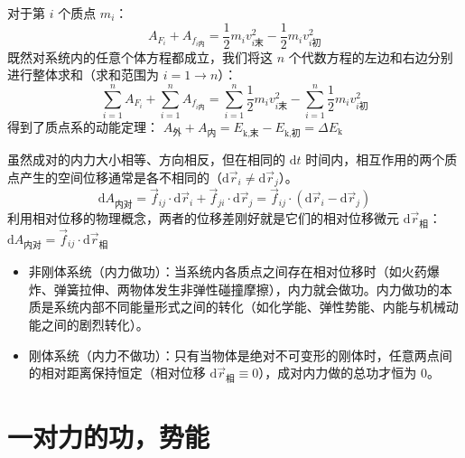 \documentclass[lang=cn,11pt]{elegantbook}
\begin{document}
\begin{theorem}[质点系动能定理]
对于第 $i$ 个质点 $m_i$：$$A_{F_i} + A_{f_{i\text{内}}} = \frac{1}{2}m_iv_{i\text{末}}^2 - \frac{1}{2}m_iv_{i\text{初}}^2$$既然对系统内的任意个体方程都成立，我们将这 $n$ 个代数方程的左边和右边分别进行整体求和（求和范围为 $i=1 \to n$）：$$\sum_{i=1}^{n} A_{F_i} + \sum_{i=1}^{n} A_{f_{i\text{内}}} = \sum_{i=1}^{n} \frac{1}{2}m_iv_{i\text{末}}^2 - \sum_{i=1}^{n} \frac{1}{2}m_iv_{i\text{初}}^2$$得到了质点系的动能定理： \(A_{\text{外}} + A_{\text{内}} = E_{\text{k,末}} - E_{\text{k,初}} = \Delta E_{\text{k}}\) 
\end{theorem}
\begin{note}
虽然成对的内力大小相等、方向相反，但在相同的 $\mathrm{d}t$ 时间内，相互作用的两个质点产生的空间位移通常是各不相同的（$\mathrm{d}\vec{r}_i \neq \mathrm{d}\vec{r}_j$）。$$\mathrm{d}A_{\text{内对}} = \vec{f}_{ij} \cdot \mathrm{d}\vec{r}_i + \vec{f}_{ji} \cdot \mathrm{d}\vec{r}_j = \vec{f}_{ij} \cdot (\mathrm{d}\vec{r}_i - \mathrm{d}\vec{r}_j)$$利用相对位移的物理概念，两者的位移差刚好就是它们的相对位移微元 $\mathrm{d}\vec{r}_{\text{相}}$： \(\mathrm{d}A_{\text{内对}} = \vec{f}_{ij} \cdot \mathrm{d}\vec{r}_{\text{相}}\) 
\begin{itemize}
\item 非刚体系统（内力做功）：当系统内各质点之间存在相对位移时（如火药爆炸、弹簧拉伸、两物体发生非弹性碰撞摩擦），内力就会做功。内力做功的本质是系统内部不同能量形式之间的转化（如化学能、弹性势能、内能与机械动能之间的剧烈转化）。
\item 刚体系统（内力不做功）：只有当物体是绝对不可变形的刚体时，任意两点间的相对距离保持恒定（相对位移 $\mathrm{d}\vec{r}_{\text{相}} \equiv 0$），成对内力做的总功才恒为 0。
\end{itemize}
\end{note}

\section{一对力的功，势能}
\end{document}

